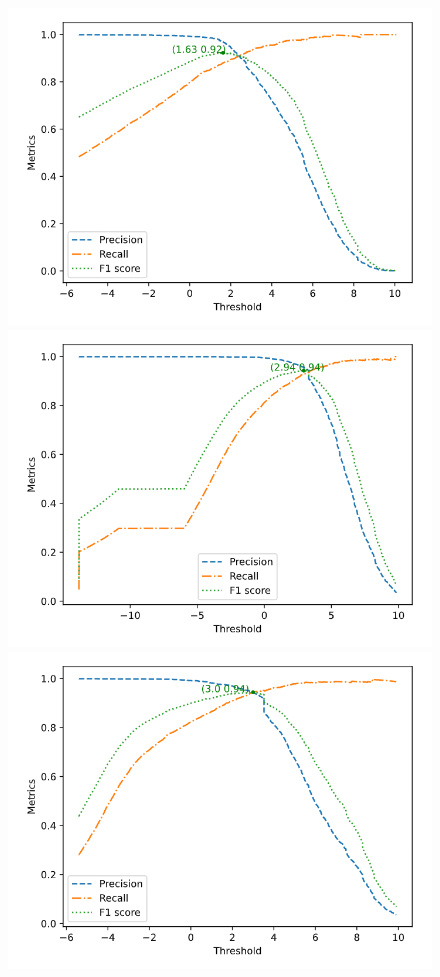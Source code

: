 \documentclass[journal,twoside]{IEEEtran}
\begin{document}
\begin{figure}[htbp]
\centerline{\includegraphics[scale=0.23]{Pics/linear-SVM_threshold_donor.png}
    \includegraphics[scale=0.23]{Pics/rbf-SVM_threshold_donor.png}
    \includegraphics[scale=0.23]{Pics/poly-SVM_threshold_donor.png}}

\end{figure}
\end{document}
